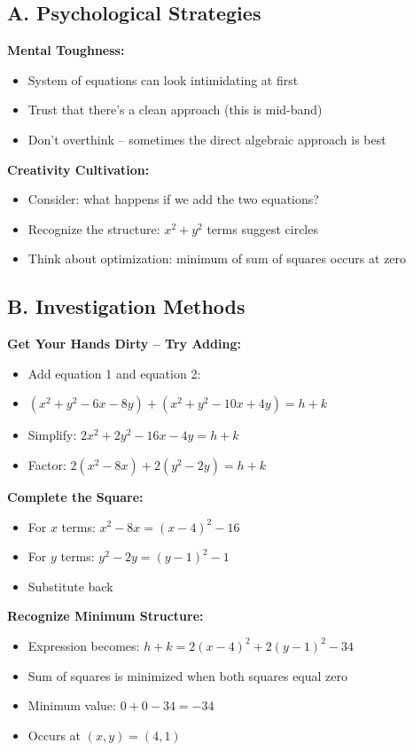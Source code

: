 \documentclass[12pt]{article}
\begin{document}
\begin{strategicbox}
\subsection*{A. Psychological Strategies}

\textbf{Mental Toughness:}
\begin{itemize}
    \item System of equations can look intimidating at first
    \item Trust that there's a clean approach (this is mid-band)
    \item Don't overthink -- sometimes the direct algebraic approach is best
\end{itemize}

\textbf{Creativity Cultivation:}
\begin{itemize}
    \item Consider: what happens if we add the two equations?
    \item Recognize the structure: $x^2 + y^2$ terms suggest circles
    \item Think about optimization: minimum of sum of squares occurs at zero
\end{itemize}

\subsection*{B. Investigation Methods}

\textbf{Get Your Hands Dirty -- Try Adding:}
\begin{itemize}
    \item Add equation 1 and equation 2:
    \item $(x^2 + y^2 - 6x - 8y) + (x^2 + y^2 - 10x + 4y) = h + k$
    \item Simplify: $2x^2 + 2y^2 - 16x - 4y = h + k$
    \item Factor: $2(x^2 - 8x) + 2(y^2 - 2y) = h + k$
\end{itemize}

\textbf{Complete the Square:}
\begin{itemize}
    \item For $x$ terms: $x^2 - 8x = (x - 4)^2 - 16$
    \item For $y$ terms: $y^2 - 2y = (y - 1)^2 - 1$
    \item Substitute back
\end{itemize}

\textbf{Recognize Minimum Structure:}
\begin{itemize}
    \item Expression becomes: $h + k = 2(x-4)^2 + 2(y-1)^2 - 34$
    \item Sum of squares is minimized when both squares equal zero
    \item Minimum value: $0 + 0 - 34 = -34$
    \item Occurs at $(x, y) = (4, 1)$
\end{itemize}


\end{strategicbox}
\end{document}
